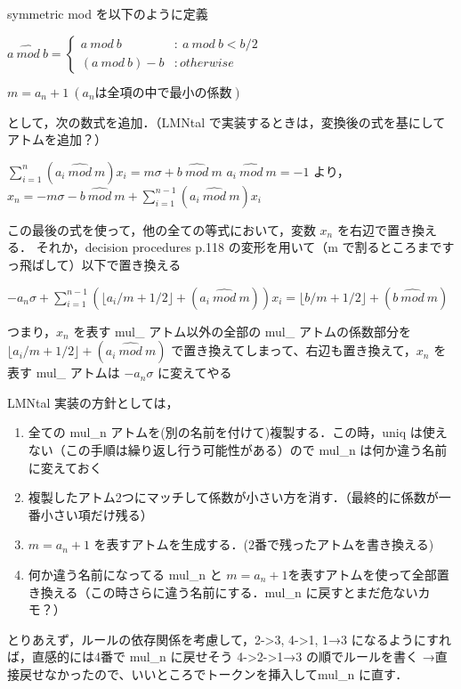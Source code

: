 symmetric mod を以下のように定義
\begin{center}
    $ a \: \widehat{mod}\: b = 
    \begin{cases}
        a \:mod\: b & :\:a \:mod\: b < b/2\\
        (a\:mod\:b)-b & :otherwise
    \end{cases}
    $
\end{center}

\begin{center}
    $m = a_n + 1 \:(a_n は全項の中で最小の係数)$
\end{center}
として，次の数式を追加．（LMNtal で実装するときは，変換後の式を基にしてアトムを追加？）
\begin{center}
    $\sum_{i=1}^n(a_i \:\widehat{mod}\: m)x_i = m \sigma + b \:\widehat{mod}\: m$
    $a_i \:\widehat{mod}\: m = -1$ より，
    $x_n = -m \sigma - b \:\widehat{mod}\:m + \sum_{i=1}^{n-1}(a_i \:\widehat{mod}\: m)x_i$
\end{center}
この最後の式を使って，他の全ての等式において，変数 $x_n$ を右辺で置き換える．
それか，decision procedures p.118 の変形を用いて（m で割るところまですっ飛ばして）以下で置き換える
\begin{center}
    $-a_n\sigma + \sum_{i=1}^{n-1}(\lfloor a_i/m + 1/2 \rfloor + (a_i \:\widehat{mod}\: m))x_i = 
    \lfloor b/m + 1/2 \rfloor + (b \:\widehat{mod}\: m)$
\end{center}
つまり，$x_n$ を表す mul\_ アトム以外の全部の mul\_ アトムの係数部分を $\lfloor a_i/m + 1/2 \rfloor + (a_i \:\widehat{mod}\: m)$
で置き換えてしまって、右辺も置き換えて，$x_n$ を表す mul\_ アトムは $-a_n\sigma$ に変えてやる

LMNtal 実装の方針としては，
\begin{enumerate}
    \item 全ての mul\_n アトムを(別の名前を付けて)複製する．この時，uniq は使えない（この手順は繰り返し行う可能性がある）ので mul\_n は何か違う名前に変えておく
    \item 複製したアトム2つにマッチして係数が小さい方を消す．（最終的に係数が一番小さい項だけ残る）
    \item $m = a_n + 1$ を表すアトムを生成する．(2番で残ったアトムを書き換える)
    \item 何か違う名前になってる mul\_n と $m=a_n+1$を表すアトムを使って全部置き換える（この時さらに違う名前にする．mul\_n に戻すとまだ危ないカモ？）
\end{enumerate}
とりあえず，ルールの依存関係を考慮して，2->3, 4->1, 1→3 になるようにすれば，直感的には4番で mul\_n に戻せそう
4->2->1→3 の順でルールを書く
→直接戻せなかったので、いいところでトークンを挿入してmul\_n に直す．



